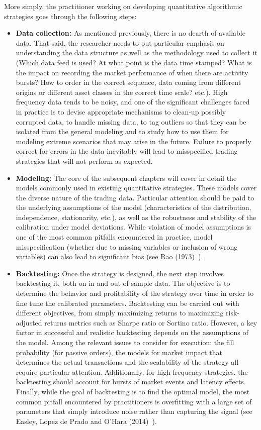 More simply, the practitioner working on developing quantitative algorithmic strategies goes through the following steps:
\begin{itemize}
\item \textbf{Data collection:} As mentioned previously, there is no dearth of available data. That said, the researcher needs to put particular emphasis on understanding the data structure as well as the methodology used to collect it (Which data feed is used? At what point is the data time stamped? What is the impact on recording the market performance of when there are activity bursts? How to order in the correct sequence, data coming from different origins or different asset classes in the correct time scale? etc.). High frequency data tends to be noisy, and one of the significant challenges faced in practice is to devise appropriate mechanisms to clean-up possibly corrupted data, to handle missing data, to tag outliers so that they can be isolated from the general modeling and to study how to use them for modeling extreme scenarios that may arise in the future. Failure to properly correct for errors in the data inevitably will lead to misspecified trading strategies that will not perform as expected.

\item \textbf{Modeling:} The core of the subsequent chapters will cover in detail the models commonly used in existing quantitative strategies. These models cover the diverse nature of the trading data.  Particular attention should be paid to the underlying assumptions of the model (characteristics of the distribution, independence, stationarity, etc.), as well as the robustness and stability of the calibration under model deviations. While violation of model assumptions is one of the most common pitfalls encountered in practice, model misspecification (whether due to missing variables or inclusion of wrong variables) can also lead to significant bias (see Rao (1973)~\cite{rao1973}). 

\item \textbf{Backtesting:} Once the strategy is designed, the next step involves backtesting it, both on in and out of sample data. The objective is to determine the behavior and profitability of the strategy over time in order to fine tune the calibrated parameters. Backtesting can be carried out with different objectives, from simply maximizing returns to maximizing risk-adjusted returns metrics such as Sharpe ratio or Sortino ratio. However, a key factor in successful and realistic backtesting depends on the assumptions of the model. Among the relevant issues to consider for execution: the fill probability (for passive orders), the models for market impact that determines the actual transactions and the scalability of the strategy all require particular attention. Additionally, for high frequency strategies, the backtesting should account for bursts of market events and latency effects. Finally, while the goal of backtesting is to find the optimal model, the most common pitfall encountered by practitioners is overfitting with a large set of parameters that simply introduce noise rather than capturing the signal (see Easley, Lopez de Prado and O'Hara (2014)~\cite{easley}).  


\end{itemize}
